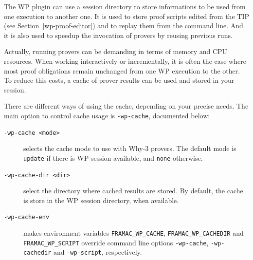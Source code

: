 The \textsf{WP} plugin can use a session directory to store informations to be used from one execution to another one.
It is used to store proof scripts edited from the TIP (see Section~\ref{wp-proof-editor}) and to replay them from the command line.
And it is also used to speedup the invocation of provers by reusing previous runs.

Actually, running provers can be demanding in terms of memory and CPU resources. When working
interactively or incrementally, it is often the case where most proof obligations remain unchanged
from one \textsf{WP} execution to the other. To reduce this costs, a cache of prover results can be used
and stored in your session.

There are different ways of using the cache, depending on your precise needs.
The main option to control cache usage is \verb+-wp-cache+, documented below:

\begin{description}
\item[\tt -wp-cache <mode>] selects the cache mode to use with \textsf{Why-3}
  provers. The default mode is \verb'update' if there is \textsf{WP} session
  available, and \verb+none+ otherwise.
\item[\tt -wp-cache-dir <dir>] select the directory where cached results are
  stored. By default, the cache is store in the \textsf{WP} session
  directory, when available.
\item[\tt -wp-cache-env] makes environment variables
  \verb|FRAMAC_WP_CACHE|, \verb|FRAMAC_WP_CACHEDIR| and \verb|FRAMAC_WP_SCRIPT|
  override command line options \verb|-wp-cache|, \verb|-wp-cachedir| and \verb|-wp-script|, respectively.
\end{description}

